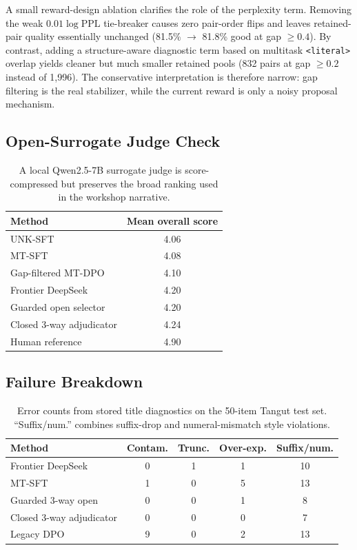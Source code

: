 \documentclass{article}
\begin{document}
A small reward-design ablation clarifies the role of the perplexity term. Removing the weak $0.01 \log \mathrm{PPL}$ tie-breaker causes zero pair-order flips and leaves retained-pair quality essentially unchanged (81.5\% $\rightarrow$ 81.8\% good at gap $\ge 0.4$). By contrast, adding a structure-aware diagnostic term based on multitask \texttt{<literal>} overlap yields cleaner but much smaller retained pools (832 pairs at gap $\ge 0.2$ instead of 1,996). The conservative interpretation is therefore narrow: gap filtering is the real stabilizer, while the current reward is only a noisy proposal mechanism.

\subsection{Open-Surrogate Judge Check}

\begin{table}[H]
\centering
\small
\begin{tabular}{lc}
\toprule
Method & Mean overall score \\
\midrule
UNK-SFT & 4.06 \\
MT-SFT & 4.08 \\
Gap-filtered MT-DPO & 4.10 \\
Frontier DeepSeek & 4.20 \\
Guarded open selector & 4.20 \\
Closed 3-way adjudicator & 4.24 \\
Human reference & 4.90 \\
\bottomrule
\end{tabular}
\caption{A local Qwen2.5-7B surrogate judge is score-compressed but preserves the broad ranking used in the workshop narrative.}
\label{tab:localsurrogate}
\end{table}

\subsection{Failure Breakdown}

\begin{table}[H]
\centering
\small
\begin{tabular}{lcccc}
\toprule
Method & Contam. & Trunc. & Over-exp. & Suffix/num. \\
\midrule
Frontier DeepSeek & 0 & 1 & 1 & 10 \\
MT-SFT & 1 & 0 & 5 & 13 \\
Guarded 3-way open & 0 & 0 & 1 & 8 \\
Closed 3-way adjudicator & 0 & 0 & 0 & 7 \\
Legacy DPO & 9 & 0 & 2 & 13 \\
\bottomrule
\end{tabular}
\caption{Error counts from stored title diagnostics on the 50-item Tangut test set. ``Suffix/num.'' combines suffix-drop and numeral-mismatch style violations.}
\label{tab:failures}
\end{table}
\end{document}
